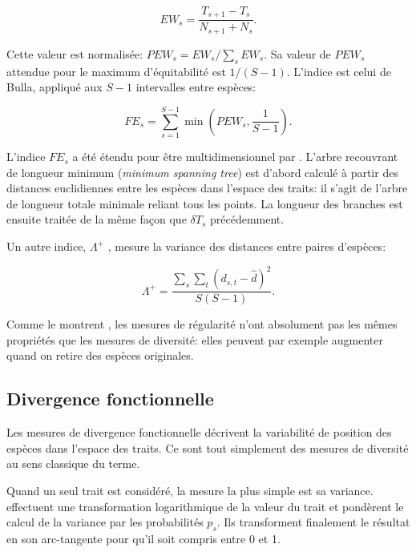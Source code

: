\documentclass[
  11pt,
  french,
  a4paper,
  extrafontsizes,onecolumn,openright
  ]{memoir}
\begin{document}
\begin{equation}
  \label{eq:EWs}
  \mathit{EW}_{s} = \frac{T_{s+1}-T_{s}}{N_{s+1}+N_{s}}.
\end{equation}

Cette valeur est normalisée: \(\mathit{PEW}_{s}={\mathit{EW}_{s}}/{\sum_s{\mathit{EW}_{s}}}\).
Sa valeur de \(\mathit{PEW}_{s}\) attendue pour le maximum d'équitabilité est \({1}/{(S-1)}\).
L'indice est celui de Bulla, appliqué aux \(S-1\) intervalles entre espèces:

\begin{equation}
  \label{eq:FEs}
  \mathit{FE}_{s} = \sum_{s=1}^{S-1}{\min(\mathit{PEW}_{s},\frac{1}{S-1})}.
\end{equation}

L'indice \(\mathit{FE}_{s}\) a été étendu pour être multidimensionnel par \textcite{Villeger2008a}.
L'arbre recouvrant de longueur minimum (\emph{minimum spanning tree}) est d'abord calculé à partir des distances euclidiennes entre les espèces dans l'espace des traits: il s'agit de l'arbre de longueur totale minimale reliant tous les points.
La longueur des branches est ensuite traitée de la même façon que \(\delta T_s\) précédemment.

Un autre indice, \({\Lambda}^+\) \autocite{Clarke2001}, mesure la variance des distances entre paires d'espèces:

\begin{equation}
  \label{eq:Clarke2001}
  {\Lambda}^+ =\frac{\sum_s{\sum_t{{\left(d_{s,t}-\hat{d}\right)}^2}}}{S\left(S-1\right)}.
\end{equation}

Comme le montrent \textcite{Merigot2011}, les mesures de régularité n'ont absolument pas les mêmes propriétés que les mesures de diversité: elles peuvent par exemple augmenter quand on retire des espèces originales.

\hypertarget{divergence-fonctionnelle}{%
\subsection{Divergence fonctionnelle}\label{divergence-fonctionnelle}}

Les mesures de divergence fonctionnelle décrivent la variabilité de position des espèces dans l'espace des traits.
Ce sont tout simplement des mesures de diversité au sens classique du terme.

Quand un seul trait est considéré, la mesure la plus simple est sa variance.
\textcite{Mason2003} effectuent une transformation logarithmique de la valeur du trait et pondèrent le calcul de la variance par les probabilités \(p_s\).
Ils transforment finalement le résultat en son arc-tangente pour qu'il soit compris entre 0 et 1.
\end{document}

